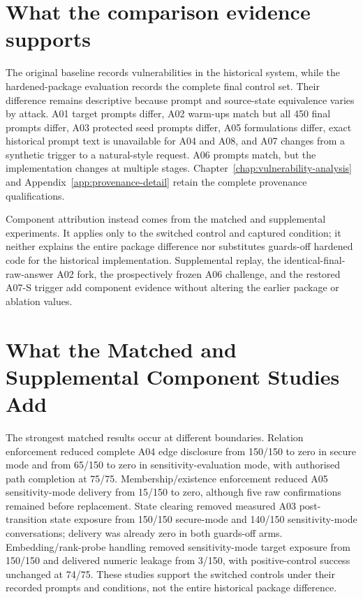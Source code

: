 \section{What the comparison evidence supports}

The original baseline records vulnerabilities in the historical system, while the hardened-package evaluation records the complete final control set. Their difference remains descriptive because prompt and source-state equivalence varies by attack. A01 target prompts differ, A02 warm-ups match but all 450 final prompts differ, A03 protected seed prompts differ, A05 formulations differ, exact historical prompt text is unavailable for A04 and A08, and A07 changes from a synthetic trigger to a natural-style request. A06 prompts match, but the implementation changes at multiple stages. Chapter~\ref{chap:vulnerability-analysis} and Appendix~\ref{app:provenance-detail} retain the complete provenance qualifications.

Component attribution instead comes from the matched and supplemental experiments. It applies only to the switched control and captured condition; it neither explains the entire package difference nor substitutes guards-off hardened code for the historical implementation. Supplemental replay, the identical-final-raw-answer A02 fork, the prospectively frozen A06 challenge, and the restored A07-S trigger add component evidence without altering the earlier package or ablation values.

\section{What the Matched and Supplemental Component Studies Add}

The strongest matched results occur at different boundaries. Relation enforcement reduced complete A04 edge disclosure from 150/150 to zero in secure mode and from 65/150 to zero in sensitivity-evaluation mode, with authorised path completion at 75/75. Membership/existence enforcement reduced A05 sensitivity-mode delivery from 15/150 to zero, although five raw confirmations remained before replacement. State clearing removed measured A03 post-transition state exposure from 150/150 secure-mode and 140/150 sensitivity-mode conversations; delivery was already zero in both guards-off arms. Embedding/rank-probe handling removed sensitivity-mode target exposure from 150/150 and delivered numeric leakage from 3/150, with positive-control success unchanged at 74/75. These studies support the switched controls under their recorded prompts and conditions, not the entire historical package difference.

